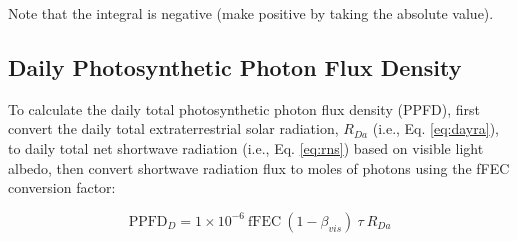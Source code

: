 \noindent Note that the integral is negative (make positive by taking the absolute value).

\subsection{Daily Photosynthetic Photon Flux Density}
\label{sec:dppfd}
To calculate the daily total photosynthetic photon flux density (PPFD), first convert the daily total extraterrestrial solar radiation, $R_{Da}$ (i.e., Eq. \ref{eq:dayra}), to daily total net shortwave radiation (i.e., Eq. \ref{eq:rns}) based on visible light albedo, then convert shortwave radiation flux to moles of photons using the fFEC conversion factor:

\begin{equation}
\label{eq:dayppfd}
	\text{PPFD}_{D} = 1 \times 10^{-6}\: \text{fFEC}\: 
	\left(1-\beta_{vis}\right)\:\tau\: R_{Da}
\end{equation}

